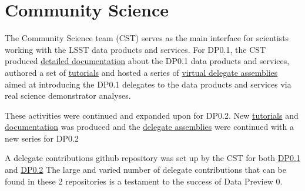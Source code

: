 \section{Community Science} \label{sec:cst}

The Community Science team (CST) serves as the main interface for scientists working with the LSST data products and services. 
For DP0.1, the CST produced \href{https://dp0-1.lsst.io/}{detailed documentation} about the DP0.1 data products and services, authored a set of \href{https://github.com/rubin-dp0/tutorial-notebooks}{tutorials} and hosted a series of \href{https://dp0-1.lsst.io/dp0-delegate-resources/index.html\#dp0-delegate-assemblies}{virtual delegate assemblies} aimed at introducing the DP0.1 delegates to the data products and services via real science demonstrator analyses.

These activities were continued and expanded upon for DP0.2. 
New \href{https://github.com/rubin-dp0/tutorial-notebooks}{tutorials} and  \href{dp0-2.lsst.io}{documentation} was produced  and the \href{https://dp0-2.lsst.io/dp0-delegate-resources/index.html\#dp0-delegate-assemblies}{delegate assemblies} were continued with a new series for DP0.2

A delegate contributions github repository was set up by the CST for both \href{https://github.com/rubin-dp0/delegate-contributions-dp01}{DP0.1} and \href{https://github.com/rubin-dp0/delegate-contributions-dp02}{DP0.2}
The large and varied number of delegate contributions that can be found in these 2 repositories is a testament to the success of Data Preview 0. 